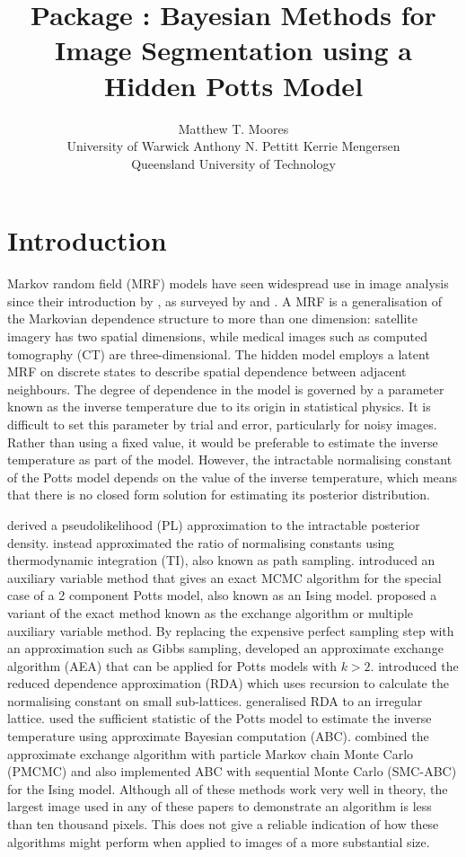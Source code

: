 \documentclass[nojss,shortnames]{jss}\usepackage[]{graphicx}\usepackage[]{color}
\author{Matthew T. Moores\\University of Warwick \And
   Anthony N. Pettitt \And
   Kerrie Mengersen\\Queensland University of Technology}
\title{\proglang{R} Package \pkg{bayesImageS}: Bayesian Methods for Image Segmentation using a Hidden Potts Model}
\begin{document}
\section{Introduction}

Markov random field (MRF) models have seen widespread use in image analysis since their introduction by \citet{Besag1974}, as surveyed by \citet{Winkler2003} and \citet{Li2009}. A MRF is a generalisation of the Markovian dependence structure to more than one dimension: satellite imagery has two spatial dimensions, while medical images such as computed tomography (CT) are three-dimensional. The hidden \citet{Potts1952} model employs a latent MRF on discrete states to describe spatial dependence between adjacent neighbours. The degree of dependence in the model is governed by a parameter known as the inverse temperature due to its origin in statistical physics. It is difficult to set this parameter by trial and error, particularly for noisy images. Rather than using a fixed value, it would be preferable to estimate the inverse temperature as part of the model. However, the intractable normalising constant of the Potts model depends on the value of the inverse temperature, which means that there is no closed form solution for estimating its posterior distribution.

\citet{Ryden1998} derived a pseudolikelihood (PL) approximation \citep{Besag1975} to the intractable posterior density. \citet{Gelman1998} instead approximated the ratio of normalising constants using thermodynamic integration (TI), also known as path sampling. \citet{Moeller2006} introduced an auxiliary variable method that gives an exact MCMC algorithm for the special case of a 2 component Potts model, also known as an Ising model. \citet{Murray2006} proposed a variant of the exact method known as the exchange algorithm or multiple auxiliary variable method. By replacing the expensive perfect sampling step \citep{Propp1996} with an approximation such as Gibbs sampling, \citet{Cucala2009} developed an approximate exchange algorithm (AEA) that can be applied for Potts models with $k>2$. \citet{Friel2009} introduced the reduced dependence approximation (RDA) which uses recursion to calculate the normalising constant on small sub-lattices. \citet{McGrory2012} generalised RDA to an irregular lattice. \citet{Grelaud2009} used the sufficient statistic of the Potts model to estimate the inverse temperature using approximate Bayesian computation (ABC). \citet{Everitt2012} combined the approximate exchange algorithm with particle Markov chain Monte Carlo (PMCMC) and also implemented ABC with sequential Monte Carlo (SMC-ABC) for the Ising model. Although all of these methods work very well in theory, the largest image used in any of these papers to demonstrate an algorithm is less than ten thousand pixels. This does not give a reliable indication of how these algorithms might perform when applied to images of a more substantial size.
\end{document}
